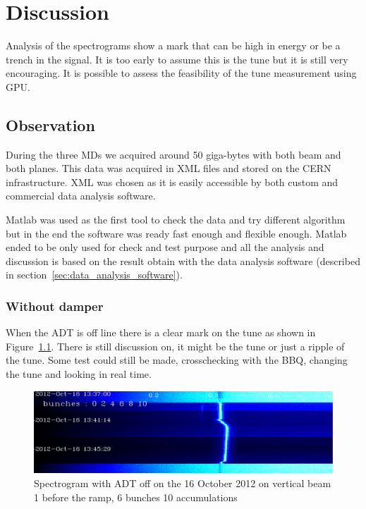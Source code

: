 
\chapter{Discussion}

Analysis of the spectrograms show a mark that can be high in energy or be a trench in the signal. It is too early to assume this is the \gls{tune} but it is still very encouraging. It is possible to assess the feasibility of the tune measurement using \gls{GPU}.

\section{Observation}

During the three \glspl{MD} we acquired around 50 giga-bytes with both beam and both planes. This data was acquired in XML files and stored on the \gls{CERN} infrastructure. XML was chosen as it is easily accessible by both custom and commercial data analysis software.

Matlab was used as the first tool to check the data and try different algorithm but in the end the software was ready fast enough and flexible enough. Matlab ended to be only used for check and test purpose and all the analysis and discussion is based on the result obtain with the data analysis software (described in section~\ref{sec:data_analysis_software}).

\subsection{Without damper}

When the \gls{ADT} is off line there is a clear mark on the tune as shown in Figure~\ref{fig:adt_off}. There is still discussion on, it might be the tune or just a ripple of the tune. Some test could still be made, crosschecking with the \gls{BBQ}, changing the tune and looking in real time.

\begin{figure}[H]
\caption{Spectrogram with ADT off on the 16 October 2012 on vertical beam 1 before the ramp, 6 bunches 10 accumulations}
\label{fig:adt_off}
\centering
\includegraphics[scale=0.3]{md-121016-vb1-m1-6bunches-10acc-1337-1349-ADT-off.pdf}
\end{figure}

